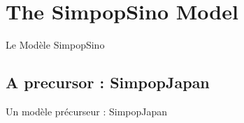 





\section[The SimpopSino Model][Le Modèle SimpopSino]{The SimpopSino Model}{Le Modèle SimpopSino}



\subsection{A precursor : SimpopJapan}{Un modèle précurseur : SimpopJapan}













